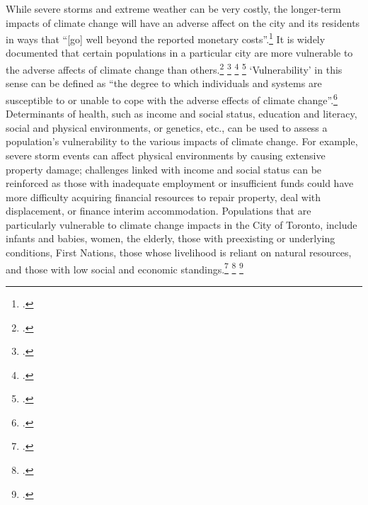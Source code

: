 While severe storms and extreme weather can be very costly, the longer-term  impacts of climate change will have an adverse affect on the city and its residents in ways that ``[go] well beyond the reported monetary costs''.\footcite[][p. 19]{CCAHealthEquity}
It is widely documented that certain populations in a particular city are more vulnerable to the adverse affects of climate change than others.\footcite[][]{EbiHealthJustice} \footcite[][]{HotWeatherResponse2006} \footcite[][p. 1153--1163]{MarmotHealthOutcomes} \footcite[][]{ReducingHealthDisparities}
`Vulnerability' in this sense can be defined as ``the degree to which individuals and systems are susceptible to or unable to cope with the adverse effects of climate change''.\footcite[][p. 6]{CCAHealthEquity}
Determinants of health, such as income and social status, education and literacy, social and physical environments, or genetics, etc., can be used to assess a population's vulnerability to the various impacts of climate change. 
For example, severe storm events can affect physical environments by causing extensive property damage; challenges linked with income and social status can be reinforced as those with inadequate employment or insufficient funds could have more difficulty acquiring financial resources to repair property, deal with displacement, or finance interim accommodation. 
Populations that are particularly vulnerable to climate change impacts in the City of Toronto, include infants and babies, women, the elderly, those with preexisting or underlying conditions, First Nations, those whose livelihood is reliant on natural resources, and those with low social and economic standings.\footcite{CCAHealthEquity} \footcite[][]{HHInACC} \footcite[][]{HealthCanadaPreparingImpacts}



